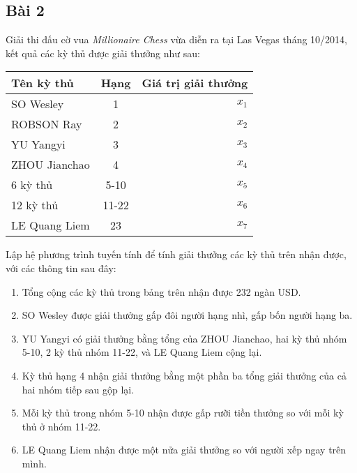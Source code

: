 \documentclass[12pt]{article}
\begin{document}
\subsection{Bài 2}


Giải thi đấu cờ vua \emph{Millionaire Chess} vừa diễn ra tại Las Vegas tháng 10/2014, kết quả các kỳ thủ được giải thưởng như sau:

\begin{center}
\begin{tabular}{l|c|r}
Tên kỳ thủ & Hạng & Giá trị giải thưởng \\
\hline
SO Wesley & 1 & $x_1$ \\%
ROBSON Ray & 2 & $x_2$ \\%
YU Yangyi & 3 & $x_3$ \\%
ZHOU Jianchao & 4 & $x_4$ \\%
6 kỳ thủ & 5-10 & $x_5$ \\%
12 kỳ thủ & 11-22 & $x_6$ \\%
LE Quang Liem & 23 & $x_7$ \\%
\end{tabular}
\end{center}

Lập hệ phương trình tuyến tính để tính giải thưởng các kỳ thủ trên nhận được, với các thông tin sau đây:
\begin{enumerate}
 \item Tổng cộng các kỳ thủ trong bảng trên nhận được 232 ngàn USD. %
 \item SO Wesley được giải thưởng gấp đôi người hạng nhì, gấp bốn người hạng ba. %
 \item YU Yangyi có giải thưởng bằng tổng của ZHOU Jianchao, hai kỳ thủ nhóm 5-10, 2 kỳ thủ nhóm 11-22, và LE Quang Liem cộng lại. %
 \item Kỳ thủ hạng 4 nhận giải thưởng bằng một phần ba tổng giải thưởng của cả hai nhóm tiếp sau gộp lại. %
 \item Mỗi kỳ thủ trong nhóm 5-10 nhận được gấp rưỡi tiền thưởng so với mỗi kỳ thủ ở nhóm 11-22. %
 \item LE Quang Liem nhận được một nửa giải thưởng so với người xếp ngay trên mình. %
\end{enumerate}
\end{document}
